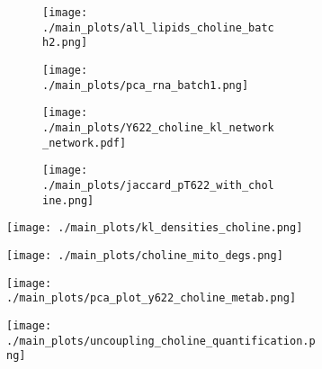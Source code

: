 \begin{figure}[H]
    \begin{subfigure}[t]{.2\textwidth}
        \begin{subfigure}[t]{\textwidth}
            \caption{}
            \texttt{[image: ./main\_plots/all\_lipids\_choline\_batch2.png]}        
        \end{subfigure} 
        \begin{subfigure}[t]{\textwidth}
            \caption{}
            \texttt{[image: ./main\_plots/pca\_rna\_batch1.png]}        
        \end{subfigure}  
    \end{subfigure}  
    \begin{subfigure}[t]{.225\textwidth}
        \begin{subfigure}[t]{\textwidth}
            \caption{}
            \texttt{[image: ./main\_plots/Y622\_choline\_kl\_network\_network.pdf]}        
        \end{subfigure}  
        \begin{subfigure}[t]{\textwidth}
            \caption{}
            \texttt{[image: ./main\_plots/jaccard\_pT622\_with\_choline.png]}        
        \end{subfigure} 
    \end{subfigure} 
    \begin{subfigure}[t]{.5\textwidth}
        \caption{}
        \texttt{[image: ./main\_plots/kl\_densities\_choline.png]}        
    \end{subfigure}  
    \begin{subfigure}[t]{.25\textwidth}
        \caption{}
        \texttt{[image: ./main\_plots/choline\_mito\_degs.png]}        
    \end{subfigure}   
    \begin{subfigure}[t]{.1\textwidth}
        \caption{}
        \texttt{[image: ./main\_plots/pca\_plot\_y622\_choline\_metab.png]}        
    \end{subfigure} 
    \begin{subfigure}[t]{.17\textwidth}
        \caption{}
        \texttt{[image: ./main\_plots/uncoupling\_choline\_quantification.png]}        
    \end{subfigure}    
    \begin{subfigure}[t]{.37\textwidth}
        \caption{}

\end{subfigure}
\end{figure}
